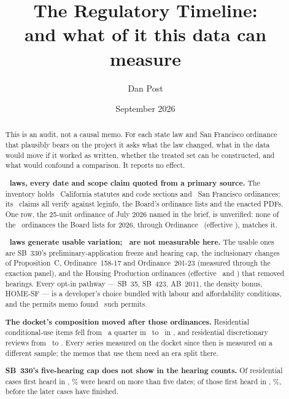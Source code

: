 \documentclass[11pt]{article}
\title{The Regulatory Timeline:\\
\large and what of it this data can measure}
\author{Dan Post}
\date{September 2026}
\begin{document}
\maketitle

\begin{abstract}
\noindent
This is an audit, not a causal memo. For each state law and San Francisco ordinance that
plausibly bears on the project it asks what the law changed, what in the data would move if it
worked as written, whether the treated set can be constructed, and what would confound a
comparison. It reports no effect.

\medskip\noindent
\textbf{\rtLaws\ laws, every date and scope claim quoted from a primary source.} The inventory
holds \rtCa\ California statutes and code sections and \rtSf\ San Francisco ordinances; its
\rtClaims\ claims all verify against leginfo, the Board's ordinance lists and the enacted PDFs.
One row, the 25-unit ordinance of July 2026 named in the brief, is unverified: none of the
\rtSfTwentySix\ ordinances the Board lists for 2026, through Ordinance \rtSfLastOrd\ (effective
\rtSfLastEff), matches it.

\medskip\noindent
\textbf{\rtUsable\ laws generate usable variation; \rtNotMeasurable\ are not measurable here.} The
usable ones are SB~330's preliminary-application freeze and hearing cap, the inclusionary
changes of Proposition~C, Ordinance~158-17 and Ordinance~201-23 (measured through the exaction
panel), and the Housing Production ordinances (effective \rtEffHpTwoZeroTwoThree\ and
\rtEffHpTwoZeroTwoFour) that removed hearings. Every opt-in pathway --- SB~35, SB~423, AB~2011,
the density bonus, HOME-SF --- is a developer's choice bundled with labour and affordability
conditions, and the permits memo found \pcMinisterialPermits\ such permits.

\medskip\noindent
\textbf{The docket's composition moved after those ordinances.} Residential conditional-use
items fell from \rtResCuPre\ a quarter in \rtWinPre\ to \rtResCuPost\ in \rtWinPost, and residential
discretionary reviews from \rtResDrPre\ to \rtResDrPost. Every series measured on the docket since
then is measured on a different sample; the memos that use them need an era split there.

\medskip\noindent
\textbf{SB~330's five-hearing cap does not show in the hearing counts.} Of residential cases
first heard in \rtHearWinPre, \rtOverFivePre\% were heard on more than five dates; of those
first heard in \rtHearWinPost, \rtOverFivePost\%, before the later cases have finished.
\end{abstract}
\end{document}
